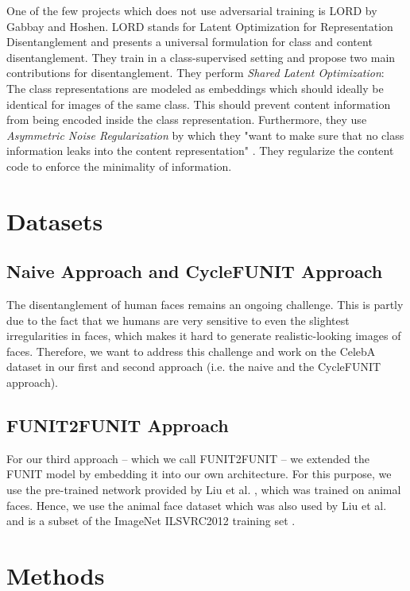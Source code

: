 \documentclass[conference]{IEEEtran}
\begin{document}
One of the few projects which does not use adversarial training is LORD by Gabbay and Hoshen. LORD stands for Latent Optimization for Representation Disentanglement and presents a universal formulation for class and content disentanglement. They train in a class-supervised setting and propose two main contributions for disentanglement. 
They perform \textit{Shared Latent Optimization}: The class representations are modeled as embeddings which should ideally be identical for images of the same class. This should prevent content information from being encoded inside the class representation. Furthermore, they use \textit{Asymmetric Noise Regularization} by which they "want to make sure that no class information leaks into the content representation" \cite{gabbay2019demystifying}. They regularize the content code to enforce the minimality of information.

\label{chap3_data}
\section{Datasets}

\subsection{Naive Approach and CycleFUNIT Approach}
The disentanglement of human faces remains an ongoing challenge. This is partly due to the fact that we humans are very sensitive to even the slightest irregularities in faces, which makes it hard to generate realistic-looking images of faces. Therefore, we want to address this challenge and work on the CelebA dataset \cite{liu2015faceattributes} in our first and second approach (i.e. the naive and the CycleFUNIT approach).

\subsection{FUNIT2FUNIT Approach}
For our third approach -- which we call FUNIT2FUNIT -- we extended the FUNIT model by embedding it into our own architecture. For this purpose, we use the pre-trained network provided by Liu et al. \cite{liu2019few}, which was trained on animal faces. Hence, we use the animal face dataset which was also used by Liu et al. and is a subset of the ImageNet ILSVRC2012 training set \cite{imagenet_cvpr09}.

\section{Methods}
\end{document}

